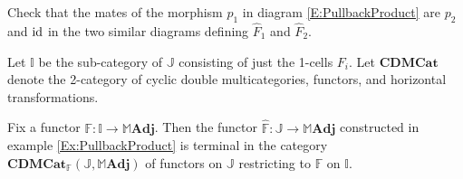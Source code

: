 \begin{exercise}
Check that the mates of the morphism $p_1$ in diagram \ref{E:PullbackProduct} are $p_2$ and $\operatorname{id}$ in the two similar diagrams defining $\hat{F}_1$ and $\hat{F}_2$.
\end{exercise}

Let $\mathbb{I}$ be the sub-category of $\mathbb{J}$ consisting of just the 1-cells $F_i$. Let $\mathbf{CDMCat}$ denote the 2-category of cyclic double multicategories, functors, and horizontal transformations.

\begin{theorem}\label{Thm:MAdjArrowObjects}
	Fix a functor $\mathbb{F}\colon\mathbb{I}\to\mathbb{M}\mathbf{Adj}$. Then the functor $\hat{\mathbb{F}}\colon\mathbb{J}\to\mathbb{M}\mathbf{Adj}$ constructed in example \ref{Ex:PullbackProduct} is terminal in the category $\mathbf{CDMCat}_{\mathbb{F}}(\mathbb{J},\mathbb{M}\mathbf{Adj})$ of functors on $\mathbb{J}$ restricting to $\mathbb{F}$ on $\mathbb{I}$.
\end{theorem}
